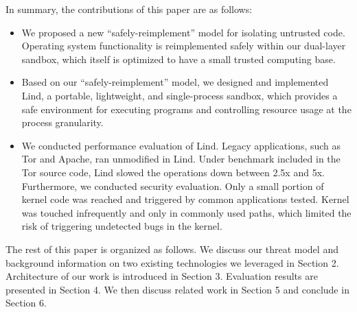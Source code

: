 \par
In summary, the contributions of this paper are as follows:

\begin{itemize} 
  
  \item We proposed a new ``safely-reimplement'' model for isolating
untrusted code. Operating system functionality is reimplemented safely
within our dual-layer sandbox, which itself is optimized to have a small
trusted computing base.
  
  \item Based on our ``safely-reimplement'' model, we designed and
implemented Lind, a portable, lightweight, and single-process sandbox,
which provides a safe 
environment for executing programs and controlling resource usage at the
process granularity.
  
  \item We conducted performance evaluation of Lind. Legacy applications,
such as Tor and Apache, ran unmodified in Lind. Under benchmark included in
the Tor source code, Lind slowed the operations down between 2.5x and 5x.
Furthermore, we conducted security evaluation. Only a small portion of
kernel code was reached and triggered by common applications tested. Kernel
was touched infrequently and only in commonly used paths, which limited the
risk of triggering undetected bugs in the kernel.

\end{itemize}


\par
The rest of this paper is organized as follows. We discuss our threat model
and background information on two existing technologies we leveraged in
Section 2. Architecture of our work is introduced in Section 3. Evaluation
results are presented in Section 4. We then discuss related work in Section
5 and conclude in Section 6.
